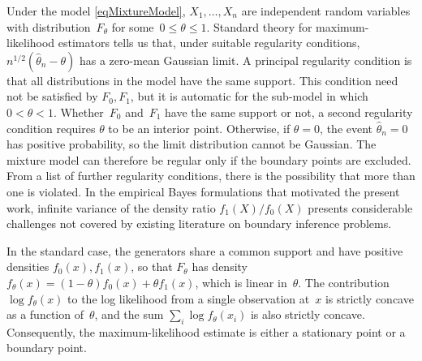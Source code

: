 \documentclass[11pt]{article}
\theoremstyle{definition}
\begin{document}
Under the model \eqref{eqMixtureModel}, $X_1,\ldots, X_n$ are independent random variables with distribution~$F_\theta$ for some~$0\le\theta\le 1$.
Standard theory for maximum-likelihood estimators tells us that, under suitable regularity conditions,
$n^{1/2} (\hat\theta_n - \theta)$ has a zero-mean Gaussian limit.
A principal regularity condition is that all distributions in the model have the same support. This condition need not be satisfied by $F_0, F_1$, but it is automatic for the sub-model in which $0 < \theta < 1$. Whether~$F_0$ and~$F_1$ have the same support or not, a second regularity condition requires $\theta$ to be an interior point. Otherwise, if $\theta=0$, the event $\hat\theta_n = 0$ has positive probability, so the limit distribution cannot be Gaussian. The mixture model can therefore be regular only if the boundary points are excluded. From a list of further regularity conditions, there is the possibility that more than one is violated. In the empirical Bayes formulations that motivated the present work, infinite variance of the density ratio $f_1(X)/f_0(X)$ presents considerable challenges not covered by existing literature on boundary inference problems.

In the standard case, the generators share a common support and have positive densities $f_0(x), f_1(x)$,
so that $F_\theta$ has density $f_\theta(x) = (1-\theta)f_0(x) + \theta f_1(x)$, which is linear in~$\theta$.
The contribution $\log f_\theta(x)$ to the log likelihood from a single observation at~$x$ is strictly concave as a function of~$\theta$,
and the sum $\sum_i \log f_\theta(x_i)$ is also strictly concave.
Consequently, the maximum-likelihood estimate is either a stationary point or a boundary point.
\end{document}

